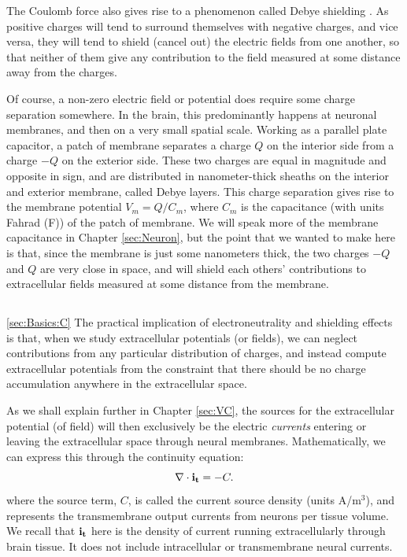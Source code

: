 The Coulomb force also gives rise to a phenomenon called Debye shielding \cite{Nunez2006}. As positive charges will tend to surround themselves with negative charges, and vice versa, they will tend to shield (cancel out) the electric fields from one another, so that neither of them give any contribution to the field measured at some distance away from the charges.

Of course, a non-zero electric field or potential does require some charge separation somewhere. In the brain, this predominantly happens at neuronal membranes, and then on a very small spatial scale. Working as a parallel plate capacitor, a patch of membrane separates a charge $Q$ on the interior side from a charge $-Q$ on the exterior side. These two charges are equal in magnitude and opposite in sign, and are distributed in nanometer-thick sheaths on the interior and exterior membrane, called Debye layers. This charge separation gives rise to the membrane potential $V_m = Q/C_m$, where $C_m$ is the capacitance (with units Fahrad (F)) of the patch of membrane. We will speak more of the membrane capacitance in Chapter \ref{sec:Neuron}, but the point that we wanted to make here is that, since the membrane is just some nanometers thick, the two charges $-Q$ and $Q$ are very close in space, and will shield each others' contributions to extracellular fields measured at some distance from the membrane. 


\subsection{}
\ref{sec:Basics:C} 
The practical implication of electroneutrality and shielding effects is that, when we study extracellular potentials (or fields), we can neglect contributions from any particular distribution of charges, and instead compute extracellular potentials from the constraint that there should be no charge accumulation anywhere in the extracellular space. 

As we shall explain further in Chapter \ref{sec:VC}, the sources for the extracellular potential (of field) will then exclusively be the electric \textit{currents} entering or leaving the extracellular space through neural membranes. Mathematically, we can express this through the continuity equation:
\begin{equation}
\nabla \cdot {\bf i_t} = -C.
\label{Basics:eq:continuity1}
\end{equation}
where the source term, $C$, is called the current source density (units A/m$^3$), and represents  
the transmembrane output currents from neurons per tissue volume. We recall that ${\bf i_t}$ here is the density of current running extracellularly through brain tissue. It does not include intracellular or transmembrane neural currents. 

